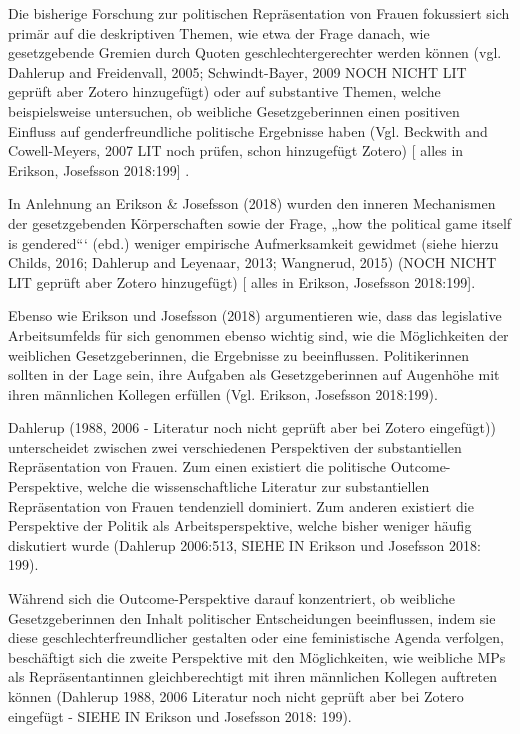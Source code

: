 \documentclass[12pt, 
    twoside=false, 
    bibliography=totoc, 
    numbers=endperiod, 
    headings=normal, 
    toc=chapterentrydotfill
    ]{scrbook}
\begin{document}
Die bisherige Forschung zur politischen Repräsentation von Frauen fokussiert sich primär auf die deskriptiven Themen, wie etwa der Frage danach, wie gesetzgebende Gremien durch Quoten geschlechtergerechter werden können (vgl. Dahlerup and Freidenvall, 2005; Schwindt-Bayer, 2009 NOCH NICHT LIT geprüft aber Zotero hinzugefügt) oder auf substantive Themen, welche beispielsweise untersuchen, ob weibliche Gesetzgeberinnen einen positiven Einfluss auf genderfreundliche politische Ergebnisse haben (Vgl. Beckwith and Cowell-Meyers, 2007 LIT noch prüfen, schon hinzugefügt Zotero) [ alles in Erikson, Josefsson 2018:199] .

In Anlehnung an Erikson & Josefsson (2018) wurden den inneren Mechanismen der gesetzgebenden Körperschaften sowie der Frage, „how the political game itself is gendered“‘ (ebd.) weniger empirische Aufmerksamkeit gewidmet (siehe hierzu Childs, 2016; Dahlerup and Leyenaar, 2013; Wangnerud, 2015) (NOCH NICHT LIT geprüft aber Zotero hinzugefügt) [ alles in Erikson, Josefsson 2018:199].

Ebenso wie Erikson und Josefsson (2018) argumentieren wie, dass das legislative Arbeitsumfelds für sich genommen ebenso wichtig sind, wie die Möglichkeiten der weiblichen Gesetzgeberinnen, die Ergebnisse zu beeinflussen. Politikerinnen sollten in der Lage sein, ihre Aufgaben als Gesetzgeberinnen auf Augenhöhe mit ihren männlichen Kollegen erfüllen (Vgl. Erikson, Josefsson 2018:199). 

Dahlerup (1988, 2006 - Literatur noch nicht geprüft aber bei Zotero eingefügt)) unterscheidet zwischen zwei verschiedenen Perspektiven der substantiellen Repräsentation von Frauen. Zum einen existiert die politische Outcome-Perspektive, welche die wissenschaftliche Literatur zur substantiellen Repräsentation von Frauen tendenziell dominiert. Zum anderen existiert die Perspektive der Politik als Arbeitsperspektive, welche bisher weniger häufig diskutiert wurde (Dahlerup 2006:513, SIEHE IN Erikson und Josefsson 2018: 199). 

Während sich die Outcome-Perspektive darauf konzentriert, ob weibliche Gesetzgeberinnen den Inhalt politischer Entscheidungen beeinflussen, indem sie diese geschlechterfreundlicher gestalten oder eine feministische Agenda verfolgen, beschäftigt sich die zweite Perspektive mit den Möglichkeiten, wie weibliche MPs als Repräsentantinnen gleichberechtigt mit ihren männlichen Kollegen auftreten können (Dahlerup 1988, 2006 Literatur noch nicht geprüft aber bei Zotero eingefügt - SIEHE IN Erikson und Josefsson 2018: 199).
\end{document}
